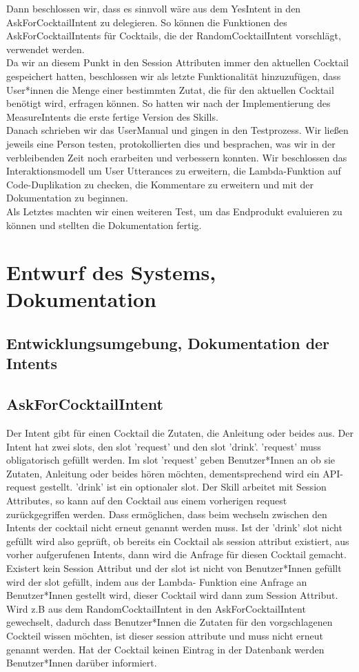 \documentclass[12pt,letterpaper]{article}
\begin{document}
Dann beschlossen wir, dass es sinnvoll wäre aus dem YesIntent in den AskForCocktailIntent zu delegieren. So können die Funktionen des AskForCocktailIntents für Cocktails, die der RandomCocktailIntent vorschlägt, verwendet werden. \\ 
Da wir an diesem Punkt in den Session Attributen immer den aktuellen Cocktail gespeichert hatten, beschlossen wir als letzte Funktionalität hinzuzufügen, dass User*innen die Menge einer bestimmten Zutat, die für den aktuellen Cocktail benötigt wird, erfragen können. So hatten wir nach der Implementierung des MeasureIntents die erste fertige Version des Skills. \\
Danach schrieben wir das UserManual und gingen in den Testprozess. Wir ließen jeweils eine Person testen, protokollierten dies und besprachen, was wir in der verbleibenden Zeit noch erarbeiten und verbessern konnten. Wir beschlossen das Interaktionsmodell um User Utterances zu erweitern, die Lambda-Funktion auf Code-Duplikation zu checken, die Kommentare zu erweitern und mit der Dokumentation zu beginnen. \\
Als Letztes machten wir einen weiteren Test, um das Endprodukt evaluieren zu können und stellten die Dokumentation fertig.

\section{Entwurf des Systems, Dokumentation}
\subsection{Entwicklungsumgebung, Dokumentation der Intents}

\subsection{AskForCocktailIntent}
Der Intent gibt für einen Cocktail die Zutaten, die Anleitung oder beides aus.
Der Intent hat zwei slots, den slot 'request' und den slot 'drink'. 'request' muss obligatorisch gefüllt werden. Im slot 'request' geben Benutzer*Innen an ob sie Zutaten, Anleitung oder beides hören möchten, dementsprechend wird ein API-request gestellt. 'drink' ist ein optionaler slot. Der Skill arbeitet mit Session Attributes, so kann auf den Cocktail aus einem vorherigen request zurückgegriffen werden. Dass ermöglichen, dass beim wechseln zwischen den Intents der cocktail nicht erneut genannt werden muss. Ist der 'drink' slot nicht gefüllt wird also geprüft, ob bereits ein Cocktail als session attribut existiert, aus vorher aufgerufenen Intents, dann wird die Anfrage für diesen Cocktail gemacht. Existert kein Session Attribut und der slot ist nicht von Benutzer*Innen gefüllt wird der slot gefüllt, indem aus der Lambda- Funktion eine Anfrage an Benutzer*Innen gestellt wird, dieser Cocktail wird dann zum Session Attribut. Wird z.B aus dem RandomCocktailIntent in den AskForCocktailIntent gewechselt, dadurch dass Benutzer*Innen die Zutaten für den vorgschlagenen Cockteil wissen möchten, ist dieser session attribute und muss nicht erneut genannt werden.
Hat der Cocktail keinen Eintrag in der Datenbank werden Benutzer*Innen darüber informiert.
\end{document}

